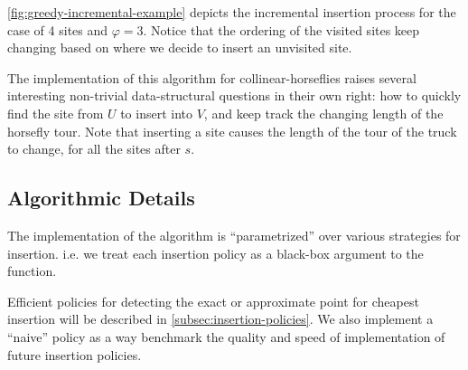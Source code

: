 \documentclass[11.5pt]{report}
\begin{document}
\autoref{fig:greedy-incremental-example} depicts the incremental insertion process for 
the case of 4 sites and $\varphi=3$. Notice that the ordering of the visited sites keep 
changing based on where we decide to insert an unvisited site. 

The implementation of this algorithm for collinear-horseflies raises several interesting non-trivial 
data-structural questions in their own right: how to quickly find the site from $U$ to 
insert into $V$, and keep track the changing length of the horsefly tour. Note that inserting a site 
causes the length of the tour of the truck to change, for all the sites after $s$. 
 
\subsection*{Algorithmic Details}
\newchunk The implementation of the algorithm is ``parametrized'' over various strategies for insertion. 
i.e. we treat each insertion policy as a black-box argument to the function.
 
Efficient policies for detecting the exact or approximate point for cheapest insertion will be 
described in \autoref{subsec:insertion-policies}.  We also implement a ``naive'' policy as a way 
benchmark the quality and speed of implementation of future insertion policies. 
\end{document}

